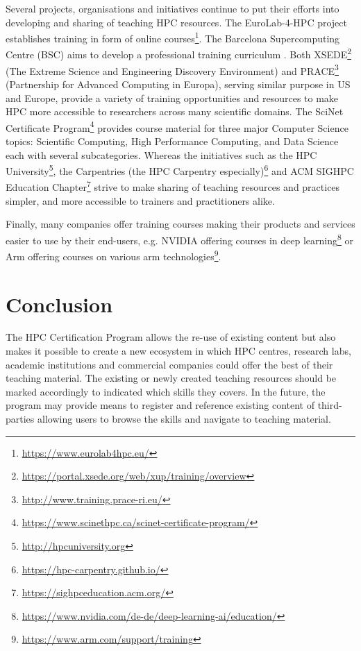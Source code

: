 \documentclass[jocse]{jocseart}
\begin{document}
Several projects, organisations and initiatives continue to put their efforts into developing and sharing of teaching HPC resources. 
The EuroLab-4-HPC project establishes training in form of online courses\footnote{\url{https://www.eurolab4hpc.eu/}}.
The Barcelona Supercomputing Centre (BSC) aims to develop a professional training curriculum \cite{sancho2016bsc}.
Both XSEDE\footnote{\url{https://portal.xsede.org/web/xup/training/overview}} (The Extreme Science and Engineering Discovery Environment) and PRACE\footnote{\url{http://www.training.prace-ri.eu/}} (Partnership for Advanced Computing in Europa), serving similar purpose in US and Europe, provide a variety of training opportunities and resources to make HPC more accessible to researchers across many scientific domains.  
The SciNet Certificate Program\footnote{\url{https://www.scinethpc.ca/scinet-certificate-program/}} provides course material for three major Computer Science topics: Scientific Computing, High Performance Computing, and Data Science each with several subcategories.
Whereas the initiatives such as the HPC University\footnote{\url{http://hpcuniversity.org}}, the Carpentries (the HPC Carpentry especially)\footnote{\url{https://hpc-carpentry.github.io/}} and ACM SIGHPC Education Chapter\footnote{\url{https://sighpceducation.acm.org/}} strive to make sharing of teaching resources and practices simpler, and more accessible to trainers and practitioners alike. 

Finally, many companies offer training courses making their products and services easier to use by their end-users, e.g. NVIDIA offering courses in deep learning\footnote{\url{https://www.nvidia.com/de-de/deep-learning-ai/education/}} or Arm offering courses on various arm technologies\footnote{\url{https://www.arm.com/support/training}}.

\section{Conclusion}
\label{sec:conclusion}

The HPC Certification Program allows the re-use of existing content but also makes it possible to create a new ecosystem in which HPC centres, research labs, academic institutions and commercial companies could offer the best of their teaching material.
The existing or newly created teaching resources should be marked accordingly to indicated which skills they covers.
In the future, the program may provide means to register and reference existing content of third-parties allowing users to browse the skills and navigate to teaching material.
\end{document}

